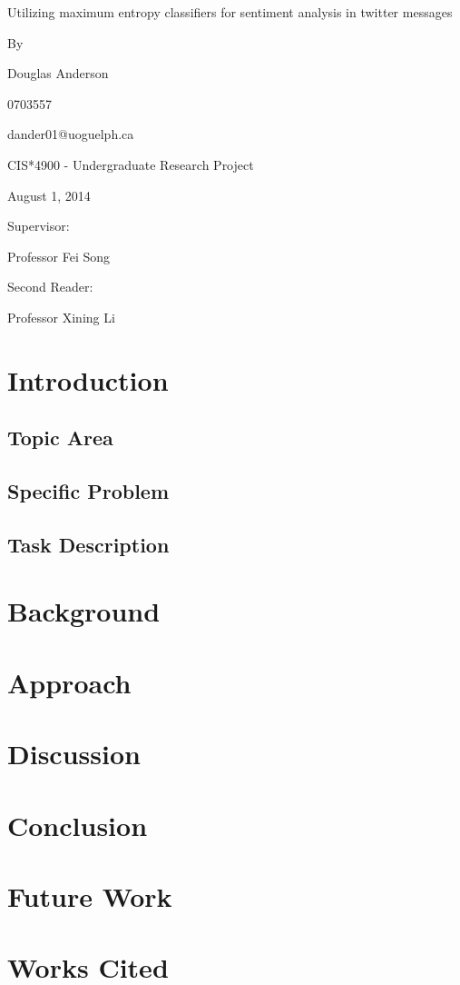 \documentclass[12pt]{article}
\begin{document}
\thispagestyle{empty}
\begin{center}

\huge

Utilizing maximum entropy classifiers for sentiment analysis in twitter messages

\large
\vspace{2.0cm}
By

\vspace{1.0cm}
Douglas Anderson

0703557

dander01@uoguelph.ca

\vspace{1.5cm}
CIS*4900 - Undergraduate Research Project

August 1, 2014 %

\vspace{1.5cm}

Supervisor:

Professor Fei Song

\vspace{1.5cm}

Second Reader:

Professor Xining Li

\end{center}


\newpage
\pagestyle{headings}
\setcounter{page}{1}

\section{Introduction}

\subsection{Topic Area}
\subsection{Specific Problem}
\subsection{Task Description}

\section{Background}

\section{Approach}

\section{Discussion}

\section{Conclusion}

\section{Future Work}

\section{Works Cited}
\end{document}
